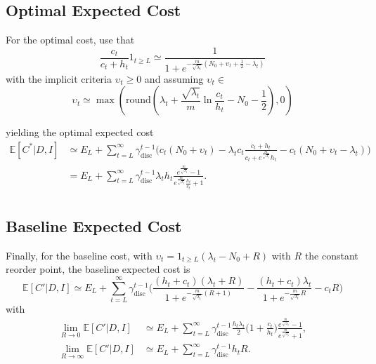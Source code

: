 \subsection{Optimal Expected Cost}
For the optimal cost, use that
\begin{equation}
	\frac{c_t}{c_t+h_t}1_{t\geq L}\simeq\frac{1}{1+e^{-\frac{m}{\sqrt{\lambda_t}}(N_0+\upsilon_t+\frac{1}{2}-\lambda_t)}}
\end{equation}
with the implicit criteria $\upsilon_t \geq 0$ and assuming $\upsilon_t\in $
\begin{equation}
	\upsilon_t \simeq \max(\text{round}(\lambda_t+\frac{\sqrt{\lambda_t}}{m}\ln\frac{c_t}{h_t}-N_0-\frac{1}{2}),0)
\end{equation}


yielding the optimal expected cost
\begin{equation}
	\begin{split}
		\mathbb{E}[C^*|D,I] &\simeq E_L+ \sum_{t=L}^{\infty} \gamma_{\text{disc}}^{t-1} \bigg( 
		c_t(N_0 + \upsilon_t)- \lambda_tc_t\frac{c_t+h_t}{c_t+e^{\frac{m}{\sqrt{\lambda_t}}}h_t}- c_t(N_0 + \upsilon_t-\lambda_t)\bigg)\\
		&= E_L+\sum_{t=L}^{\infty} \gamma_{\text{disc}}^{t-1} \lambda_th_t\frac{e^{\frac{m}{\sqrt{\lambda_t}}}-1}{e^{\frac{m}{\sqrt{\lambda_t}}}\frac{h_t}{c_t}+1}.\\
	\end{split}
\end{equation}

\subsection{Baseline Expected Cost}
Finally, for the baseline cost, with $\upsilon_t= 1_{t\geq L}(\lambda_t-N_0+R)$ with $R$ the constant reorder point, the baseline expected cost is
\begin{equation}
	\mathbb{E}[C'|D,I] \simeq E_L+\sum_{t=L}^{\infty} \gamma_{\text{disc}}^{t-1} \bigg( 
	\frac{(h_t+c_t)(\lambda_t+R)}{1+e^{-\frac{m}{\sqrt{\lambda_t}}(R+1)}}- \frac{(h_t+c_t)\lambda_t}{1+e^{-\frac{m}{\sqrt{\lambda_t}}R}} - c_tR\bigg)
\end{equation}
with
\begin{equation}
	\begin{split}
		\lim\limits_{R\rightarrow 0} \mathbb{E}[C'|D,I] & \simeq E_L+\sum_{t=L}^{\infty} \gamma_{\text{disc}}^{t-1}\frac{h_t\lambda_t}{2}\bigg(1+\frac{c_t}{h_t}\bigg)  
		\frac{e^{\frac{m}{\sqrt{\lambda_t}}}-1}{e^{\frac{m}{\sqrt{\lambda_t}}}+1},\\
		\lim\limits_{R\rightarrow \infty} \mathbb{E}[C'|D,I] & \simeq E_L+\sum_{t=L}^{\infty} \gamma_{\text{disc}}^{t-1} 
		h_tR.\\
	\end{split}
\end{equation}


